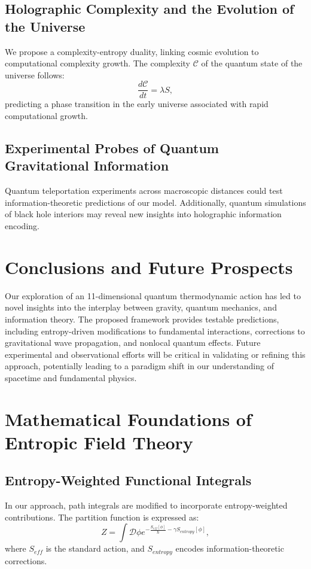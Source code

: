 \documentclass{article}
\begin{document}
\subsection{Holographic Complexity and the Evolution of the Universe}
We propose a complexity-entropy duality, linking cosmic evolution to computational complexity growth. The complexity $\mathcal{C}$ of the quantum state of the universe follows:
\begin{equation}
\frac{d\mathcal{C}}{dt} = \lambda S,
\end{equation}
predicting a phase transition in the early universe associated with rapid computational growth.

\subsection{Experimental Probes of Quantum Gravitational Information}
Quantum teleportation experiments across macroscopic distances could test information-theoretic predictions of our model. Additionally, quantum simulations of black hole interiors may reveal new insights into holographic information encoding.

\section{Conclusions and Future Prospects}

Our exploration of an 11-dimensional quantum thermodynamic action has led to novel insights into the interplay between gravity, quantum mechanics, and information theory. The proposed framework provides testable predictions, including entropy-driven modifications to fundamental interactions, corrections to gravitational wave propagation, and nonlocal quantum effects. Future experimental and observational efforts will be critical in validating or refining this approach, potentially leading to a paradigm shift in our understanding of spacetime and fundamental physics.

\section{Mathematical Foundations of Entropic Field Theory}

\subsection{Entropy-Weighted Functional Integrals}
In our approach, path integrals are modified to incorporate entropy-weighted contributions. The partition function is expressed as:
\begin{equation}
Z = \int \mathcal{D}\phi e^{-\frac{S_{eff}[\phi]}{\hbar} - \gamma S_{entropy}[\phi]},
\end{equation}
where $S_{eff}$ is the standard action, and $S_{entropy}$ encodes information-theoretic corrections.
\end{document}
